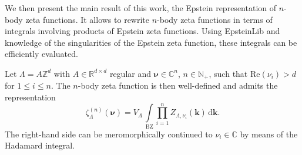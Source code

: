 \documentclass[]{amsart}
\numberwithin{mythm}{section}
\renewcommand{\Re}[1]{\mathrm{Re}(#1)}
\begin{document}
We then present the main result of this work, the Epstein representation of $n$-body zeta functions. It allows to rewrite  $n$-body zeta functions in terms of integrals involving products of Epstein zeta functions. Using EpsteinLib and knowledge of the singularities of the Epstein zeta function, these integrals can be efficiently evaluated.
\begin{theorem}
\label{thm:epstein_representation}
    Let $\Lambda=A\mathds Z^d$ with $A\in \mathds R^{d\times d}$ regular and $\bm \nu \in \mathds C^n$, $n\in \mathds N_+$, such that $\Re{\nu_i}>d$ for $1\le i\le n$. The $n$-body zeta function is then well-defined and admits the representation 
    \[
    \zeta_\Lambda^{(n)}(\bm \nu)=V_\Lambda\, \int \limits_{\mathrm{BZ}} \prod_{i=1}^n Z_{\Lambda,\nu_i} (\bm k) \,\mathrm d \bm k.
    \]
    The right-hand side can be meromorphically continued to $\nu_i\in \mathds C$ by means of the Hadamard integral.
\end{theorem}
\end{document}
